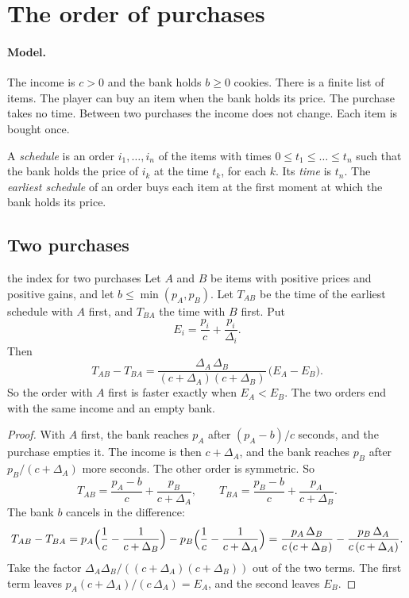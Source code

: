 \documentclass[11pt]{article}
\theoremstyle{boxed}
\begin{document}
\section{The order of purchases}\label{sec:purchases}

\paragraph{Model.} The income is $c>0$ and the bank holds $b\ge0$ cookies. There is a finite
list of items. The player can buy an item when the bank holds its price. The purchase takes no
time. Between two purchases the income does not change. Each item is bought once.

A \emph{schedule} is an order $i_1,\dots,i_n$ of the items with times $0\le t_1\le\dots\le t_n$
such that the bank holds the price of $i_k$ at the time $t_k$, for each $k$. Its \emph{time} is
$t_n$. The \emph{earliest schedule} of an order buys each item at the first moment at which the
bank holds its price.

\subsection{Two purchases}

\begin{maintheorem}{the index for two purchases}\label{thm:pair}
Let $A$ and $B$ be items with positive prices and positive gains, and let
$b\le\min(p_A,p_B)$. Let $T_{AB}$ be the time of the earliest schedule with $A$ first, and
$T_{BA}$ the time with $B$ first. Put
\[
  E_i=\frac{p_i}{c}+\frac{p_i}{\Delta_i}.
\]
Then
\[
  T_{AB}-T_{BA}=\frac{\Delta_A\,\Delta_B}{(c+\Delta_A)(c+\Delta_B)}\,\bigl(E_A-E_B\bigr).
\]
So the order with $A$ first is faster exactly when $E_A<E_B$. The two orders end with the same
income and an empty bank.
\end{maintheorem}

\begin{proof}
With $A$ first, the bank reaches $p_A$ after $(p_A-b)/c$ seconds, and the purchase empties it.
The income is then $c+\Delta_A$, and the bank reaches $p_B$ after $p_B/(c+\Delta_A)$ more
seconds. The other order is symmetric. So
\[
  T_{AB}=\frac{p_A-b}{c}+\frac{p_B}{c+\Delta_A},\qquad
  T_{BA}=\frac{p_B-b}{c}+\frac{p_A}{c+\Delta_B}.
\]
The bank $b$ cancels in the difference:
\[
  T_{AB}-T_{BA}
  =p_A\Bigl(\frac1c-\frac1{c+\Delta_B}\Bigr)-p_B\Bigl(\frac1c-\frac1{c+\Delta_A}\Bigr)
  =\frac{p_A\,\Delta_B}{c\,(c+\Delta_B)}-\frac{p_B\,\Delta_A}{c\,(c+\Delta_A)}.
\]
Take the factor $\Delta_A\Delta_B/((c+\Delta_A)(c+\Delta_B))$ out of the two terms. The first
term leaves $p_A(c+\Delta_A)/(c\,\Delta_A)=E_A$, and the second leaves $E_B$.
\end{proof}
\end{document}
